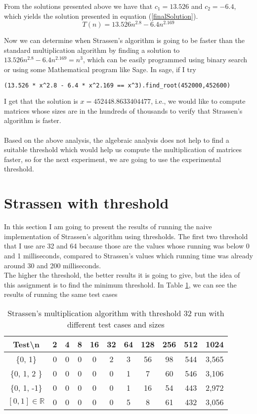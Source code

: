 \documentclass[tikz, 12pt]{scrartcl}
\begin{document}
From the solutions presented above we have that $c_1 = 13.526$ and $c_2 = -6.4$, which yields the solution presented in equation (\ref{finalSolution}).
\begin{equation}\label{finalSolution}
T(n) = 13.526 n^{2.8} - 6.4 n^{2.169}
\end{equation}

Now we can determine when Strassen's algorithm is going to be faster than the standard multiplication algorithm by finding a solution to $13.526 n^{2.8} - 6.4 n^{2.169} = n^3$, which can be easily programmed using binary search or using some Mathematical program like Sage. In sage, if I try 
\begin{verbatim}
(13.526 * x^2.8 - 6.4 * x^2.169 == x^3).find_root(452000,452600)
\end{verbatim}

I get that the solution is $x = 452448.8633404477$, i.e., we would like to compute matrices whose sizes are in the hundreds of thousands to verify that Strassen's algorithm is faster. \\
\\
Based on the above analysis, the algebraic analysis does not help to find a suitable threshold which would help us compute the multiplication of matrices faster, so for the next experiment, we are going to use the experimental threshold.

\section{Strassen with threshold}

In this section I am going to present the results of running the naive implementation of Strassen's algorithm using thresholds. The first two threshold that I use are 32 and 64 because those are the values whose running was below 0 and 1 milliseconds, compared to Strassen's values which running time was already around 30 and 200 milliseconds. \\
The higher the threshold, the better results it is going to give, but the idea of this assignment is to find the minimum threshold. In Table \ref{strassen32}, we can see the results of running the same test cases 

\begin{table}[h!]
\caption{Strassen's multiplication algorithm with threshold 32 run with different test cases and sizes\label{strassen32}}
\centering
\begin{tabular}{|c|cccccccccc|}
\hline
Test\textbackslash  n		&	2	&	4	&	8	&	16	&	32	&	64	&	128		&	256		&	512		&	1024\\
\hline
\{0, 1\}				&	0	&	0	&	0	&	0	&	2	&	3	&	56		&	98		&	544		&	3,565\\
\{0, 1, 2 \}				&	0	&	0	&	0	&	0	&	0	&	1	&	7		&	60		&	546		&	3,106\\
\{0, 1, -1\}				&	0	&	0	&	0	&	0	&	0	&	1	&	16		&	54		&	443		&	2,972\\
$[0, 1] \in \mathbb{R}$	&	0	&	0	&	0	&	0	&	0	&	5	&	8		&	61		&	432		&	3,056\\
\hline
\end{tabular}
\end{table}
\end{document}
